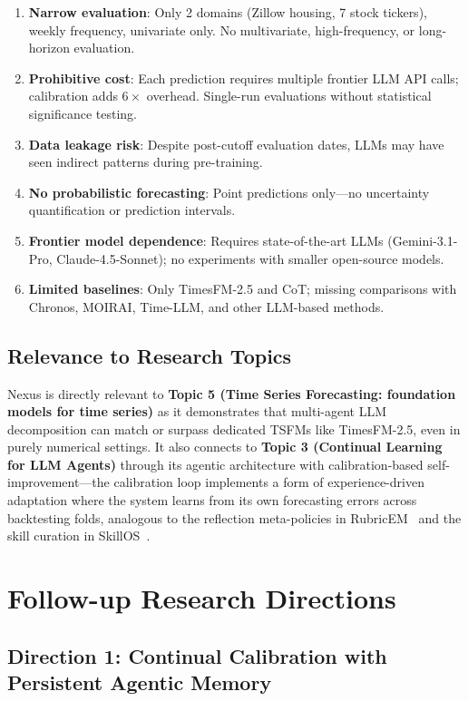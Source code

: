 \documentclass[11pt,a4paper]{article}
\begin{document}
\begin{enumerate}[nosep]
\item \textbf{Narrow evaluation}: Only 2 domains (Zillow housing, 7 stock tickers), weekly frequency, univariate only. No multivariate, high-frequency, or long-horizon evaluation.
\item \textbf{Prohibitive cost}: Each prediction requires multiple frontier LLM API calls; calibration adds $6\times$ overhead. Single-run evaluations without statistical significance testing.
\item \textbf{Data leakage risk}: Despite post-cutoff evaluation dates, LLMs may have seen indirect patterns during pre-training.
\item \textbf{No probabilistic forecasting}: Point predictions only---no uncertainty quantification or prediction intervals.
\item \textbf{Frontier model dependence}: Requires state-of-the-art LLMs (Gemini-3.1-Pro, Claude-4.5-Sonnet); no experiments with smaller open-source models.
\item \textbf{Limited baselines}: Only TimesFM-2.5 and CoT; missing comparisons with Chronos, MOIRAI, Time-LLM, and other LLM-based methods.
\end{enumerate}

\subsection{Relevance to Research Topics}

Nexus is directly relevant to \textbf{Topic 5 (Time Series Forecasting: foundation models for time series)} as it demonstrates that multi-agent LLM decomposition can match or surpass dedicated TSFMs like TimesFM-2.5, even in purely numerical settings. It also connects to \textbf{Topic 3 (Continual Learning for LLM Agents)} through its agentic architecture with calibration-based self-improvement---the calibration loop implements a form of experience-driven adaptation where the system learns from its own forecasting errors across backtesting folds, analogous to the reflection meta-policies in RubricEM~\cite{rubricem} and the skill curation in SkillOS~\cite{skillos}.

\section{Follow-up Research Directions}

\subsection{Direction 1: Continual Calibration with Persistent Agentic Memory}
\end{document}
